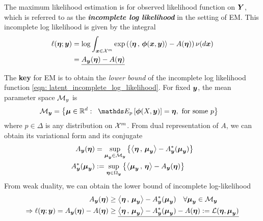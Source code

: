 \documentclass[11pt]{article}
\begin{document}
The maximum likelihood estimation is for observed likelihood function on $\boldsymbol{Y}$, which is referred to as the \emph{\textbf{incomplete log likelihood}} in the setting of EM. This incomplete log likelihood is given by the integral
\begin{align}
\ell(\boldsymbol{\eta} ;\boldsymbol{y}) &=  \log\int_{\boldsymbol{x} \in {\mathcal X}^{m}}\exp\left(\left\langle \boldsymbol{\eta}\,,\, \boldsymbol{\phi}(\boldsymbol{x}, \boldsymbol{y}) \right\rangle - A(\boldsymbol{\eta})\right)\nu(d\boldsymbol{x})  \nonumber\\
&=\underline{A_{\boldsymbol{y}}(\boldsymbol{\eta})  - A(\boldsymbol{\eta})}   \label{eqn: latent_incomplete_log_likelihood}  
\end{align}

The \textbf{key} for EM is to obtain the \emph{lower bound} of the incomplete log likelihood function \eqref{eqn: latent_incomplete_log_likelihood}. For fixed $\boldsymbol{y}$, the mean parameter space ${\mathcal M}_{y}$ is 
\begin{align}
\cM_{\mb{y}} &= \set{\mb{\mu} \in \bR^{d}: \;\; \E{p}{\mb{\phi}(X, \mb{y})} = \mb{\eta}, \text{ for some }p}
\end{align} where $p \in \Delta$ is any distribution on ${\mathcal X}^{m}$. From dual representation of $A$, we can obtain its variational form and its conjugate
\begin{align}
A_{\boldsymbol{y}}(\boldsymbol{\eta}) &= \sup_{\boldsymbol{\mu}_{\boldsymbol{y}} \in {\mathcal M}_{\boldsymbol{y}}}\left\{\left\langle \boldsymbol{\eta}\,,\, \boldsymbol{\mu}_{\boldsymbol{y}} \right\rangle - A_{\boldsymbol{y}}^{*}(\boldsymbol{\mu}_{\boldsymbol{y}})\right\} \label{eqn: latent_log_partition_variational} \\
A_{\boldsymbol{y}}^{*}(\boldsymbol{\mu}_{\boldsymbol{y}}) &:=   \sup_{\boldsymbol{\eta}\in \Omega_{\boldsymbol{y}}}\left\{\left\langle \boldsymbol{\mu}_{\boldsymbol{y}}\,,\, \boldsymbol{\eta} \right\rangle - A_{\boldsymbol{y}}(\boldsymbol{\eta}) \right\} \label{eqn: latent_neg_entropy}
\end{align} From weak duality, we can obtain the lower bound of incomplete log-likelihood
\begin{align}
A_{\boldsymbol{y}}(\boldsymbol{\eta}) &\ge \left\langle \boldsymbol{\eta}\,,\, \boldsymbol{\mu}_{\boldsymbol{y}} \right\rangle - A_{\boldsymbol{y}}^{*}(\boldsymbol{\mu}_{\boldsymbol{y}})\quad \forall \boldsymbol{\mu}_{\boldsymbol{y}} \in {\mathcal M}_{\boldsymbol{y}} \nonumber\\
\Rightarrow \ell(\boldsymbol{\eta} ;\boldsymbol{y})= A_{\boldsymbol{y}}(\boldsymbol{\eta})  - A(\boldsymbol{\eta}) & \ge \underline{\left\langle \boldsymbol{\eta}\,,\, \boldsymbol{\mu}_{\boldsymbol{y}} \right\rangle - A_{\boldsymbol{y}}^{*}(\boldsymbol{\mu}_{\boldsymbol{y}})  - A(\boldsymbol{\eta}) := {\mathcal L}(\boldsymbol{\eta}, \boldsymbol{\mu}_{\boldsymbol{y}})} \label{eqn: latent_incomplete_log_likelihood_lower_bound}
\end{align}
\end{document}
